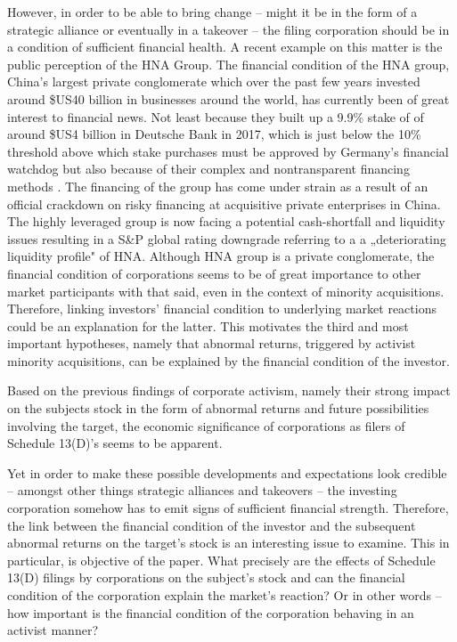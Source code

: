 \documentclass[12pt]{article}
\begin{document}
However, in order to be able to bring change -- might it be in the form of a strategic alliance or eventually in a takeover -- the filing corporation should be in a condition of sufficient financial health. 
A recent example on this matter is the public perception of the HNA Group. The financial condition of the HNA group, China's largest private conglomerate which over the past few years invested around \$US40 billion in businesses around the world, has currently been of great interest to financial news. Not least because they built up a 9.9\% stake of of around \$US4 billion in Deutsche Bank in 2017, which is just below the 10\% threshold above which stake purchases must be approved by Germany's financial watchdog but also because of their complex and nontransparent financing methods .
The financing of the group has come under strain as a result of an official crackdown on risky financing at acquisitive private enterprises in China. The highly leveraged group is now facing a potential cash-shortfall and liquidity issues resulting in a S\&P global rating downgrade referring to a a „deteriorating liquidity profile" of HNA. Although HNA group is  a private conglomerate, the financial condition of corporations seems to be of great importance to other market participants with that said, even in the context of minority acquisitions. Therefore, linking investors' financial condition to  underlying market reactions could be an explanation for the latter. This motivates the third and most important hypotheses, namely that abnormal returns, triggered by activist minority acquisitions, can be explained by the financial condition of the investor. 


Based on the previous findings of corporate activism, namely their strong impact on the subjects stock in the form of abnormal returns and future possibilities involving the target, the economic significance of corporations as filers of Schedule 13(D)'s seems to be apparent.

Yet in order to make these possible developments and expectations look credible -- amongst other things strategic alliances and takeovers -- the investing corporation somehow has to emit signs of sufficient financial strength. Therefore, the link between the financial condition of the investor and the subsequent abnormal returns on the target's stock is an interesting issue to examine. This in particular, is objective of the paper. What precisely are the effects of Schedule 13(D) filings by corporations on the subject's stock and can the financial condition of the corporation explain the market's reaction? Or in other words -- how important is the financial condition of the corporation behaving in an activist manner? 
\end{document}
